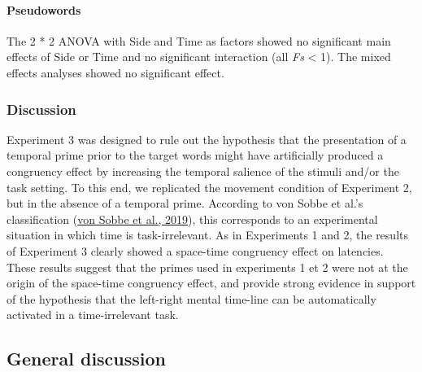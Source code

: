 \documentclass[
  a4paper,12pt,twoside,onecolumn,openright,final,oldfontcommands]{memoir}
\begin{document}
\hypertarget{pseudowords-2}{%
\paragraph{Pseudowords}\label{pseudowords-2}}

The 2 * 2 ANOVA with Side and Time as factors showed no significant main effects of Side or Time and no significant interaction (all \emph{Fs} \textless{} 1). The mixed effects analyses showed no significant effect.

\hypertarget{discussion-2}{%
\subsubsection{Discussion}\label{discussion-2}}

Experiment 3 was designed to rule out the hypothesis that the presentation of a temporal prime prior to the target words might have artificially produced a congruency effect by increasing the temporal salience of the stimuli and/or the task setting. To this end, we replicated the movement condition of Experiment 2, but in the absence of a temporal prime. According to von Sobbe et al.'s classification (\protect\hyperlink{ref-von_sobbe_space-time_2019}{von Sobbe et al., 2019}), this corresponds to an experimental situation in which time is task-irrelevant. As in Experiments 1 and 2, the results of Experiment 3 clearly showed a space-time congruency effect on latencies. These results suggest that the primes used in experiments 1 et 2 were not at the origin of the space-time congruency effect, and provide strong evidence in support of the hypothesis that the left-right mental time-line can be automatically activated in a time-irrelevant task.

\hypertarget{general-discussion}{%
\subsection{General discussion}\label{general-discussion}}
\end{document}
